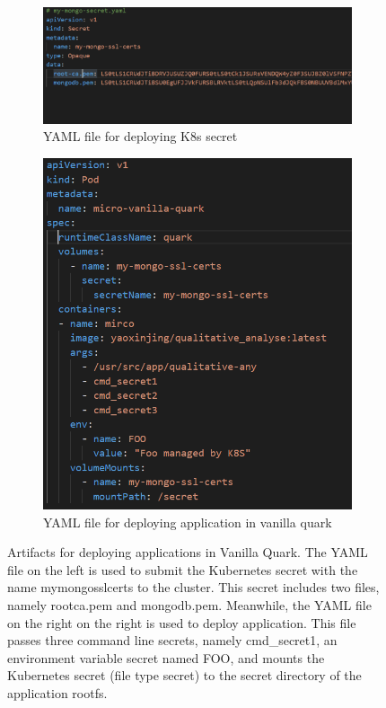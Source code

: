 \begin{figure}[H]
    \centering
    \begin{subfigure}[b]{0.45\textwidth}
        \centering
        \includegraphics[width=\textwidth]{images/mongo_secret.PNG}
        \caption{YAML file for deploying K8s secret}
        \label{fig:mongo_secret}
    \end{subfigure}
    \hfill
    \begin{subfigure}[b]{0.45\textwidth}
        \centering
        \includegraphics[width=\textwidth]{images/vanila_quark_deployment.PNG}
        \caption{YAML file for deploying application in vanilla quark}
        \label{fig:vanila_quark_deployment}
    \end{subfigure}
    \hfill
       \caption[Artifacts for deploying applications in Vanilla Quark]{Artifacts for deploying applications in Vanilla Quark. The YAML file on the left is used to submit the Kubernetes secret with the name my\-mongo\-ssl\-certs to the cluster. 
       This secret includes two files, namely root\-ca.pem and mongodb.pem. Meanwhile, the YAML file on the right on the right is used to deploy application. This file passes three command line secrets, namely cmd\_secret1, an environment variable secret named FOO, and mounts the 
       Kubernetes secret (file type secret) to the secret directory of the application rootfs.}
       \label{fig:three graphs}
\end{figure}
